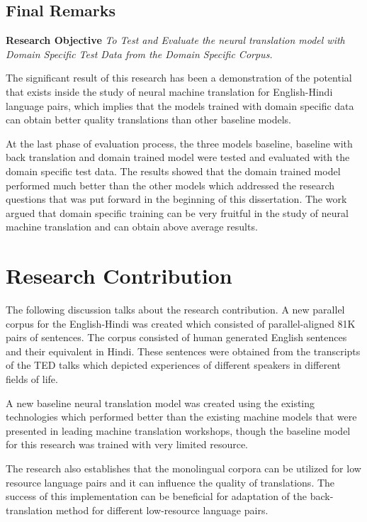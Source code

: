 \subsection{Final Remarks }
\textbf{Research Objective} \textit{To Test and Evaluate the neural translation model with Domain Specific Test Data from the Domain Specific Corpus.}

The significant result of this research has been a demonstration of the potential that exists inside the study of neural machine translation for English-Hindi language pairs, which implies that the models trained with domain specific data can obtain better quality translations than other baseline models.

At the last phase of evaluation process, the three models baseline, baseline with back translation and domain trained model were tested and evaluated with the domain specific test data. The results showed that the domain trained model performed much better than the other models which addressed the research questions that was put forward in the beginning of this dissertation. The work argued that domain specific training can be very fruitful in the study of neural machine translation and can obtain above average results.

\section{Research Contribution}
The following discussion talks about the research contribution. A new parallel corpus for the English-Hindi was created  which consisted of parallel-aligned 81K pairs of sentences. The corpus consisted of human generated English sentences and their equivalent in Hindi. These sentences were obtained from the transcripts of the TED talks which depicted experiences of different speakers in different fields of life. 

A new baseline neural translation model was created using the existing technologies which performed better than the existing machine models that were presented in leading machine translation workshops, though the baseline model for this research was trained with very limited resource.

The research also establishes that the monolingual corpora can be utilized for low resource language pairs and it can influence the quality of translations. The success of this implementation can be beneficial for adaptation of the back-translation method for different low-resource language pairs.

